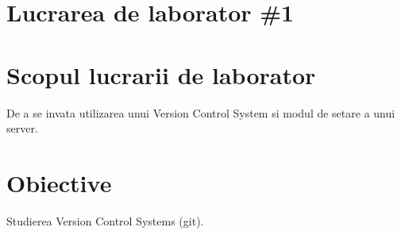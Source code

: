 \section*{Lucrarea de laborator \#1}

\section{Scopul lucrarii de laborator}
De a se invata utilizarea unui Version Control System si modul de setare a unui server.
\section{Obiective}
Studierea Version Control Systems (git).

\clearpage
